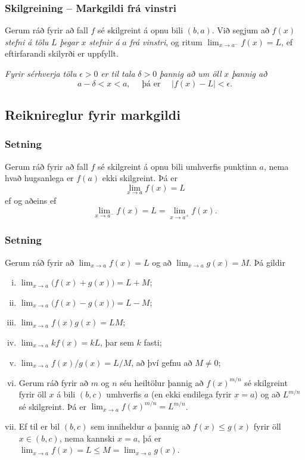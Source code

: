 \documentclass[icelandic,a4paper,12pt]{article}
\begin{document}
\pause

\subsubsection{Skilgreining -- Markgildi frá vinstri} Gerum ráð fyrir að fall $f$ sé
skilgreint á opnu bili $(b,a)$.  Við segjum að $f(x)$
\emph{stefni á tölu} $L$ \emph{þegar} $x$ \emph{stefnir á} $a$ \emph{frá vinstri}, og ritum
$\lim_{x\rightarrow a^-} f(x)=L$, ef eftirfarandi skilyrði er uppfyllt.

\emph{Fyrir sérhverja tölu} $\epsilon>0$ \emph{er til tala} $\delta>0$ \emph{þannig
  að um öll} $x$ \emph{þannig að} 
$$
a-\delta<x<a,\quad \text{ þá er } \quad |f(x)-L|<\epsilon.
$$

\subsection{Reiknireglur fyrir markgildi}
\subsubsection{Setning} Gerum ráð fyrir að fall $f$ sé
skilgreint á opnu bili umhverfis punktinn $a$, nema hvað hugsanlega er
$f(a)$ ekki skilgreint.  Þá er 
$$\lim_{x\rightarrow a} f(x)=L$$
ef og aðeins ef 
$$\lim_{x\rightarrow a^-} f(x)=L=\lim_{x\rightarrow a^+} f(x).$$

\subsubsection{Setning}   Gerum ráð fyrir að
$\lim_{x\rightarrow a}f(x)=L$ og að   $\lim_{x\rightarrow a}g(x)=M$.
Þá gildir

\begin{enumerate}[(i)]
  \item $\lim_{x\rightarrow a}\Big(f(x)+g(x)\Big)=L+M$;
  \item $\lim_{x\rightarrow a}\Big(f(x)-g(x)\Big)=L-M$;
  \item $\lim_{x\rightarrow a}f(x)g(x)=LM$;
  \item $\lim_{x\rightarrow a}kf(x)=kL$, þar sem $k$ fasti;
  \item $\lim_{x\rightarrow a}f(x)/g(x)=L/M$, að því gefnu að $M\neq 0$;
  \item Gerum ráð fyrir að $m$ og $n$ séu 
heiltölur þannig að $f(x)^{m/n}$ sé
skilgreint fyrir öll $x$ á bili $(b,c)$ umhverfis $a$ (en ekki
endilega fyrir $x=a$) og að $L^{m/n}$ sé skilgreint.
Þá er $\lim_{x\rightarrow a}f(x)^{m/n}=L^{m/n}$.
  \item Ef til er bil $(b,c)$ sem inniheldur $a$ þannig að 
$f(x)\leq g(x)$ fyrir öll $x\in (b,c)$, nema kannski $x=a$, þá er
$\lim_{x\rightarrow a}f(x)=L\leq M=\lim_{x\rightarrow a}g(x)$.
\end{enumerate}
\end{document}
